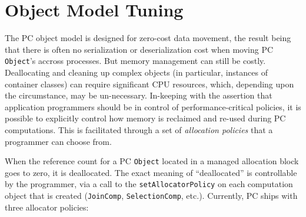 \section{Object Model Tuning}

\noindent
The PC object model is designed for zero-cost data movement, the result being that there is often no serialization or deserialization
cost
when moving PC \texttt{Object}'s accross processes.  But memory management can still be costly.  Deallocating and cleaning
up complex objects (in particular, instances of container classes) can require significant CPU resources, which, depending upon the 
circumstance, may be un-necessary.  In-keeping with the assertion that application programmers should be in
control of performance-critical policies, it is possible to explicitly control how memory is reclaimed and re-used during PC computations.
This is facilitated through a set of \emph{allocation policies} that a programmer can choose from.

When the reference count for a PC \texttt{Object} located in a managed allocation block goes to zero, it is deallocated.  The exact
meaning of ``deallocated'' is controllable by the programmer, via a call to the \texttt{setAllocatorPolicy} on each computation object
that is created (\texttt{JoinComp}, \texttt{SelectionComp}, etc.).  Currently, PC ships with
three allocator policies:

